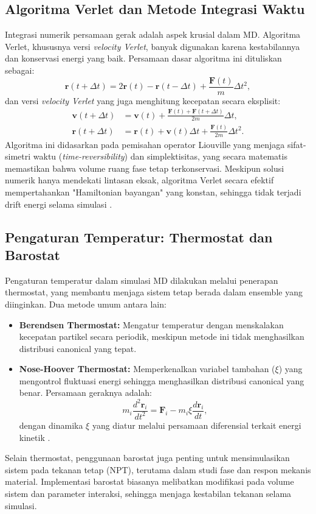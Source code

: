 \subsection{Algoritma Verlet dan Metode Integrasi Waktu}
Integrasi numerik persamaan gerak adalah aspek krusial dalam MD.
Algoritma Verlet, khususnya versi \emph{velocity Verlet}, banyak digunakan karena kestabilannya dan konservasi energi yang baik.
Persamaan dasar algoritma ini dituliskan sebagai:
\begin{equation}
    \mathbf{r}(t+\Delta t) = 2\mathbf{r}(t) - \mathbf{r}(t-\Delta t) + \frac{\mathbf{F}(t)}{m}\Delta t^2,
\end{equation}
dan versi \emph{velocity Verlet} yang juga menghitung kecepatan secara eksplisit:
\begin{align}
    \mathbf{v}(t+\Delta t) &= \mathbf{v}(t) + \frac{\mathbf{F}(t) + \mathbf{F}(t+\Delta t)}{2m}\Delta t, \\
    \mathbf{r}(t+\Delta t) &= \mathbf{r}(t) + \mathbf{v}(t)\Delta t + \frac{\mathbf{F}(t)}{2m}\Delta t^2.
\end{align}
Algoritma ini didasarkan pada pemisahan operator Liouville yang menjaga sifat-simetri waktu (\emph{time-reversibility}) dan simplektisitas, yang secara matematis memastikan bahwa volume ruang fase tetap terkonservasi.
Meskipun solusi numerik hanya mendekati lintasan eksak, algoritma Verlet secara efektif mempertahankan "Hamiltonian bayangan" yang konstan, sehingga tidak terjadi drift energi selama simulasi \cite{Allen1989}.

\subsection{Pengaturan Temperatur: Thermostat dan Barostat}
Pengaturan temperatur dalam simulasi MD dilakukan melalui penerapan thermostat, yang membantu menjaga sistem tetap berada dalam ensemble yang diinginkan.
Dua metode umum antara lain:
\begin{itemize}
    \item \textbf{Berendsen Thermostat:} Mengatur temperatur dengan menskalakan kecepatan partikel secara periodik, meskipun metode ini tidak menghasilkan distribusi canonical yang tepat.
    \item \textbf{Nose-Hoover Thermostat:} Memperkenalkan variabel tambahan (\(\xi\)) yang mengontrol fluktuasi energi sehingga menghasilkan distribusi canonical yang benar.
Persamaan geraknya adalah:
    \begin{equation}
        m_i \frac{d^2 \mathbf{r}_i}{dt^2} = \mathbf{F}_i - m_i \xi \frac{d\mathbf{r}_i}{dt},
    \end{equation}
    dengan dinamika \(\xi\) yang diatur melalui persamaan diferensial terkait energi kinetik \cite{Allen1989}.
\end{itemize}
Selain thermostat, penggunaan barostat juga penting untuk mensimulasikan sistem pada tekanan tetap (NPT), terutama dalam studi fase dan respon mekanis material.
Implementasi barostat biasanya melibatkan modifikasi pada volume sistem dan parameter interaksi, sehingga menjaga kestabilan tekanan selama simulasi.

